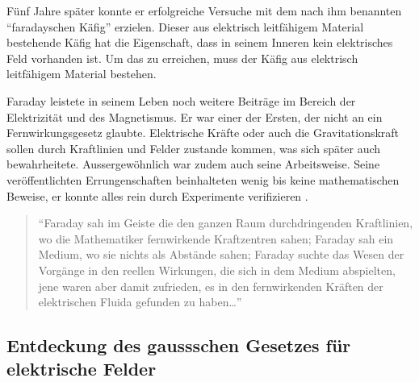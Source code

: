 Fünf Jahre später konnte er erfolgreiche Versuche mit dem nach ihm benannten ``faradayschen Käfig'' erzielen.
%
Dieser aus elektrisch leitfähigem Material bestehende Käfig hat die Eigenschaft, dass in seinem Inneren kein elektrisches Feld vorhanden ist.
Um das zu erreichen, muss der Käfig aus elektrisch leitfähigem Material bestehen.

Faraday leistete in seinem Leben noch weitere Beiträge im Bereich der Elektrizität und des Magnetismus. 
Er war einer der Ersten, der nicht an ein Fernwirkungsgesetz glaubte.
%
Elektrische Kräfte oder auch die Gravitationskraft sollen durch Kraftlinien und Felder zustande kommen, was sich später auch bewahrheitete.
%
%
Aussergewöhnlich war zudem auch seine Arbeitsweise.
Seine veröffentlichten Errungenschaften beinhalteten wenig bis keine mathematischen Beweise, er konnte alles rein durch Experimente verifizieren \cite{maxwell:Michael_Faraday}.
\begin{quote}
	``Faraday sah im Geiste die den ganzen Raum durchdringenden Kraftlinien, wo die Mathematiker fernwirkende Kraftzentren sahen; Faraday sah ein Medium, wo sie nichts als Abstände sahen; Faraday suchte das Wesen der Vorgänge in den reellen Wirkungen, die sich in dem Medium abspielten, jene waren aber damit zufrieden, es in den fernwirkenden Kräften der elektrischen Fluida gefunden zu haben\dots''
\cite{maxwell:zitat}
\end{quote}

\subsection{Entdeckung des gaussschen Gesetzes für elektrische Felder}

